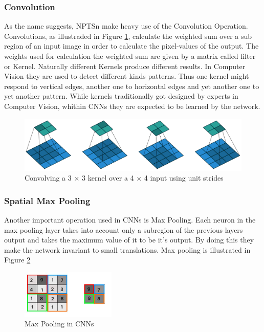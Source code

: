 \documentclass{llncs}
\begin{document}
\subsubsection{Convolution}
As the name suggests, NPTSn make heavy use of the Convolution Operation. Convolutions, as illustraded in Figure \ref{fig:conv}, calculate the weighted sum over a sub region of an input image in order to calculate the pixel-values of the output. The weights used for calculation the weighted sum are given by a matrix called filter or Kernel. Naturally different Kernels produce different results. In Computer Vision they are used to detect different kinds patterns. Thus one kernel might respond to vertical edges, another  one to horizontal edges and yet another one to yet another pattern. While kernels traditionally got designed by experts in Computer Vision, whithin CNNs they are expected to be learned by the network.

\begin{figure}
	\begin{center}
		\includegraphics[width=\textwidth]{result_images/Conv.png}
		\caption{Convolving a 3 × 3 kernel over a 4 × 4 input using unit strides}
		\label{fig:conv}
	\end{center}
\end{figure}

\subsubsection{Spatial Max Pooling}
Another important operation used in CNNs is Max Pooling.
Each neuron in the max pooling layer takes into account only a subregion of the previous
layers output and takes the maximum value of it to be it's output. By doing this they make the network invariant to small translations. Max pooling is illustrated in Figure \ref{fig:maxpooling}

\begin{figure}
	\begin{center}
		\includegraphics[width=0.40\textwidth]{result_images/maxpooling.jpg}
		\caption{Max Pooling in CNNs}
		\label{fig:maxpooling}
	\end{center}
\end{figure}
\end{document}
